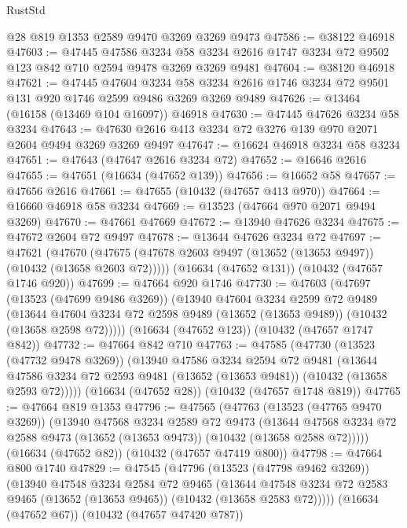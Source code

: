 \begin{lexlean}{RustStd}
\begin{coremodule}
    @28
    @819
    @1353
    @2589
    @9470
    @3269
    @3269
    @9473
@47586 := @38122 @46918
@47603 := @47445
    @47586
    @3234
    @58
    @3234
    @2616
    @1747
    @3234
    @72
    @9502
    @123
    @842
    @710
    @2594
    @9478
    @3269
    @3269
    @9481
@47604 := @38120 @46918
@47621 := @47445
    @47604
    @3234
    @58
    @3234
    @2616
    @1746
    @3234
    @72
    @9501
    @131
    @920
    @1746
    @2599
    @9486
    @3269
    @3269
    @9489
@47626 := @13464 (@16158 (@13469 @104 @16097)) @46918
@47630 := @47445 @47626 @3234 @58 @3234
@47643 := @47630 @2616 @413 @3234 @72 @3276 @139 @970 @2071 @2604 @9494 @3269 @3269 @9497
@47647 := @16624 @46918 @3234 @58 @3234
@47651 := @47643 (@47647 @2616 @3234 @72)
@47652 := @16646 @2616
@47655 := @47651 (@16634 (@47652 @139))
@47656 := @16652 @58
@47657 := @47656 @2616
@47661 := @47655 (@10432 (@47657 @413 @970))
@47664 := @16660 @46918 @58 @3234
@47669 := @13523 (@47664 @970 @2071 @9494 @3269)
@47670 := @47661 @47669
@47672 := @13940 @47626 @3234
@47675 := @47672 @2604 @72 @9497
@47678 := @13644 @47626 @3234 @72
@47697 := @47621
    (@47670 (@47675 (@47678 @2603 @9497 (@13652 (@13653 @9497)) (@10432 (@13658 @2603 @72)))))
    (@16634 (@47652 @131))
    (@10432 (@47657 @1746 @920))
@47699 := @47664 @920 @1746
@47730 := @47603
    (@47697
      (@13523 (@47699 @9486 @3269))
      (@13940
        @47604
        @3234
        @2599
        @72
        @9489
        (@13644 @47604 @3234 @72 @2598 @9489 (@13652 (@13653 @9489)) (@10432 (@13658 @2598 @72)))))
    (@16634 (@47652 @123))
    (@10432 (@47657 @1747 @842))
@47732 := @47664 @842 @710
@47763 := @47585
    (@47730
      (@13523 (@47732 @9478 @3269))
      (@13940
        @47586
        @3234
        @2594
        @72
        @9481
        (@13644 @47586 @3234 @72 @2593 @9481 (@13652 (@13653 @9481)) (@10432 (@13658 @2593 @72)))))
    (@16634 (@47652 @28))
    (@10432 (@47657 @1748 @819))
@47765 := @47664 @819 @1353
@47796 := @47565
    (@47763
      (@13523 (@47765 @9470 @3269))
      (@13940
        @47568
        @3234
        @2589
        @72
        @9473
        (@13644 @47568 @3234 @72 @2588 @9473 (@13652 (@13653 @9473)) (@10432 (@13658 @2588 @72)))))
    (@16634 (@47652 @82))
    (@10432 (@47657 @47419 @800))
@47798 := @47664 @800 @1740
@47829 := @47545
    (@47796
      (@13523 (@47798 @9462 @3269))
      (@13940
        @47548
        @3234
        @2584
        @72
        @9465
        (@13644 @47548 @3234 @72 @2583 @9465 (@13652 (@13653 @9465)) (@10432 (@13658 @2583 @72)))))
    (@16634 (@47652 @67))
    (@10432 (@47657 @47420 @787))

\end{coremodule}
\end{lexlean}
